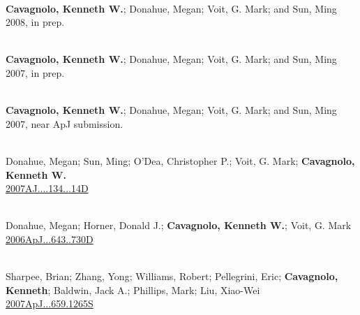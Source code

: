 \documentclass[11pt]{cv}
\begin{document}
\begin{llist}


{}\\
{\bf Cavagnolo, Kenneth W.}; Donahue, Megan; Voit, G. Mark; and Sun, Ming\\
2008, in prep.

{}\\
{\bf Cavagnolo, Kenneth W.}; Donahue, Megan; Voit, G. Mark; and Sun, Ming\\
2007, in prep.

{}\\
{\bf Cavagnolo, Kenneth W.}; Donahue, Megan; Voit, G. Mark; and Sun, Ming\\
2007, near ApJ submission.



{}\\
Donahue, Megan; Sun, Ming; O'Dea, Christopher P.; Voit, G. Mark; {\bf Cavagnolo, Kenneth W.}\\
\href{http://adsabs.harvard.edu/abs/2007AJ....134...14D}{2007AJ....134...14D}

{}\\
Donahue, Megan; Horner, Donald J.; {\bf Cavagnolo, Kenneth W.}; Voit, G. Mark\\
\href{http://adsabs.harvard.edu/abs/2006ApJ...643..730D}{2006ApJ...643..730D}

{}\\
Sharpee, Brian; Zhang, Yong; Williams, Robert; Pellegrini, Eric; {\bf Cavagnolo, Kenneth}; Baldwin, Jack A.; Phillips, Mark; Liu, Xiao-Wei\\
\href{http://adsabs.harvard.edu/abs/2007ApJ...659.1265S}{2007ApJ...659.1265S}


\end{llist}
\end{document}
